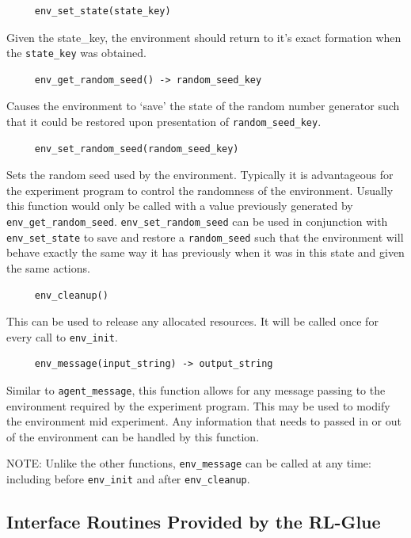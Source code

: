 \documentclass[11pt]{article}
\begin{document}
\begin{verbatim}
     env_set_state(state_key)\end{verbatim}
Given the state\_key, the environment should return to it's exact formation when the \texttt{state\_key} was obtained. 

\begin{verbatim}
     env_get_random_seed() -> random_seed_key
\end{verbatim}
Causes the environment to `save' the state of the random number generator such that it could be restored upon presentation of \texttt{random\_seed\_key}.

\begin{verbatim}
     env_set_random_seed(random_seed_key)
\end{verbatim}
Sets the random seed used by the environment. Typically it is advantageous for the experiment program to control the randomness of the environment.  Usually
this function would only be called with a value previously generated by \texttt{env\_get\_random\_seed}. \texttt{env\_set\_random\_seed} can be used in conjunction with \texttt{env\_set\_state} to save and restore a \texttt{random\_seed} such that the environment will behave exactly the same way it has previously when it was in this state and given the same actions.

\begin{verbatim}                 
     env_cleanup()\end{verbatim}
This can be used to release any allocated resources. It will be called once for every call to \texttt{env\_init}.

\begin{verbatim}
     env_message(input_string) -> output_string
\end{verbatim}
Similar to \texttt{agent\_message}, this function allows for any message passing to the environment required by the experiment program. This may be used to modify the environment mid experiment. Any information that needs to passed in or out of the environment can be handled by this function.

NOTE: Unlike the other functions, \texttt{env\_message} can be called at any time: including before \texttt{env\_init} and after \texttt{env\_cleanup}.

\subsection{Interface Routines Provided by the RL-Glue}
\end{document}
